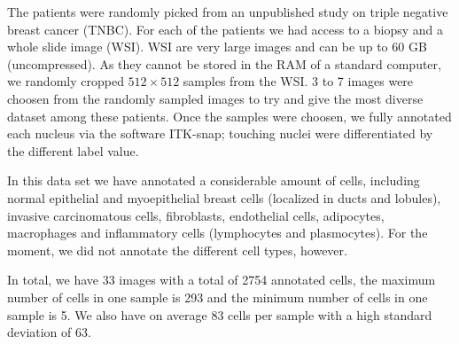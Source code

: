 \documentclass{article}
\begin{document}
The patients were randomly picked from an unpublished study on
triple negative breast cancer (TNBC). For each of the patients we had access
to a biopsy and a whole slide image (WSI). WSI are very large images
and can be up to 60 GB 
(uncompressed). As they cannot be stored in the RAM of a standard computer, we randomly cropped $512 \times 512$ samples 
from the WSI. %
3 to 7 images were choosen from the randomly sampled images to try and
give the most diverse dataset among these patients. Once the samples
were choosen, we fully annotated each nucleus via the software
ITK-snap; touching nuclei were differentiated by the different label
value. 

In this data set we have annotated a considerable amount of cells,
including normal epithelial and myoepithelial breast cells (localized in
ducts and lobules), invasive carcinomatous cells, fibroblasts, endothelial
cells, adipocytes, macrophages and
inflammatory cells (lymphocytes and plasmocytes). For the moment, we
did not annotate the different cell types, however. 

In total, we have 33 images with a total of 2754 annotated cells,
the maximum number of cells in one sample is 293 and the minimum
number of cells in one sample is 5. We also have on average 83 cells
per sample with a high standard deviation of 63. 

\end{document}

